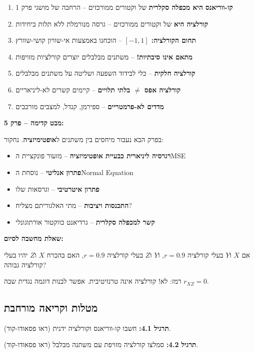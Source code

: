 \begin{enumerate}
\item \textbf{קו-ווריאנס היא מכפלה סקלרית} של וקטורים ממורכזים – הרחבה של מושגי פרק \num{1}
\item \textbf{קורלציה היא } של וקטורים ממורכזים – גרסה מנורמלת ללא תלות ביחידות
\item \textbf{תחום הקורלציה: $[-1, 1]$} – הוכחנו באמצעות אי-שוויון קושי-שוורץ
\item \textbf{מתאם אינו סיבתיות!} – משתנים מבלבלים יוצרים קורלציות מזויפות
\item \textbf{קורלציה חלקית} – כלי לבידוד השפעה ושליטה על משתנים מבלבלים
\item \textbf{קורלציה אפס $\neq$ בלתי תלויים} – קיימים קשרים לא-ליניאריים
\item \textbf{מדדים לא-פרמטריים} – ספירמן, קנדל,  למצבים מורכבים
\end{enumerate}

\textbf{מבט קדימה – פרק \num{5}:}

בפרק הבא נעבור מיחסים בין משתנים ל\textbf{אופטימיזציה}. נחקור:

\begin{itemize}
\item \textbf{רגרסיה ליניארית כבעיית אופטימיזציה} – מזעור פונקציית ה\en{-}MSE
\item \textbf{פתרון אנליטי} – נוסחת ה\en{-}Normal Equation
\item \textbf{פתרון איטרטיבי} –  וגרסאות שלו
\item \textbf{התכנסות ויציבות} – מתי האלגוריתם מצליח?
\item \textbf{קשר למכפלה סקלרית} – גרדיאנט כווקטור אורתוגונלי
\end{itemize}

\textbf{שאלת מחשבה לסיום:}

אם $X$ ו\en{-}$Y$ בעלי קורלציה $r = 0.9$, ו\en{-}$Y$ ו\en{-}$Z$ בעלי קורלציה $r = 0.9$, האם בהכרח $X$ ו\en{-}$Z$ יהיו בעלי קורלציה גבוהה?

רמז: לא! קורלציה אינה טרנזיטיבית. אפשר לבנות דוגמה נגדית שבה $r_{XZ} = 0$.

\subsection*{מטלות וקריאה מורחבת}

\textbf{תרגיל \num{4.1}:} חשבו קו-ווריאנס וקורלציה ידנית (ראו פסאודו-קוד).

\textbf{תרגיל \num{4.2}:} סמלצו קורלציה מזויפת עם משתנה מבלבל (ראו פסאודו-קוד).

